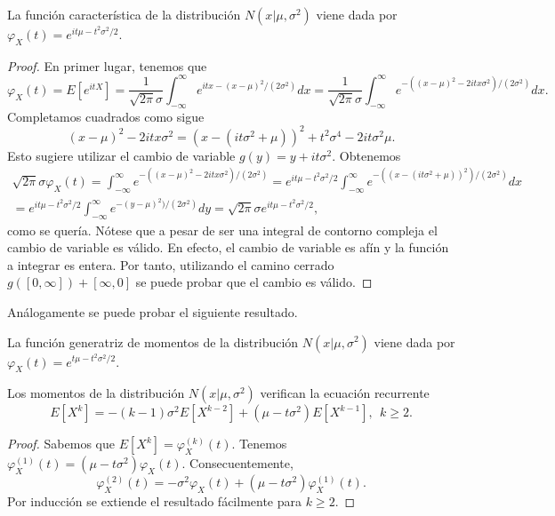 \documentclass{article}
\begin{document}
\begin{prop} \label{prop:normal:cf}
    La función característica de la distribución $N(x|\mu, \sigma^2)$ viene dada por $\varphi_X(t) = e^{it\mu - t^2 \sigma^2 / 2}$.
\end{prop}
\begin{proof}
    En primer lugar, tenemos que
    \[\varphi_X(t) = E[e^{itX}] = \frac{1}{\sqrt{2\pi}\sigma} \int_{-\infty}^{\infty} e^{itx-(x-\mu)^2 / (2\sigma^2)} dx = \frac{1}{\sqrt{2\pi}\sigma} \int_{-\infty}^{\infty} e^{-((x-\mu)^2 - 2itx\sigma^2) / (2\sigma^2)} dx.\]
    Completamos cuadrados como sigue
    \[(x-\mu)^2 - 2 itx\sigma^2 = (x - (it \sigma^2 + \mu))^2 + t^2 \sigma^4 - 2it\sigma^2 \mu.\]
    Esto sugiere utilizar el cambio de variable $g(y) = y + it \sigma^2$. Obtenemos
    \begin{align*}
        \sqrt{2\pi}\sigma \varphi_X(t) = \int_{-\infty}^{\infty} e^{-((x-\mu)^2 - 2itx\sigma^2) / (2\sigma^2)} = e^{it\mu - t^2 \sigma^2 / 2} \int_{-\infty}^{\infty} e^{-((x-(it \sigma^2 + \mu))^2 ) / (2\sigma^2)} dx \\
        = e^{it\mu - t^2 \sigma^2 / 2} \int_{-\infty}^{\infty} e^{-(y - \mu)^2 ) / (2\sigma^2)} dy = \sqrt{2\pi}\sigma e^{it\mu - t^2 \sigma^2 / 2},
    \end{align*}
    como se quería.
    Nótese que a pesar de ser una integral de contorno compleja el cambio de variable es válido. En efecto, el cambio de variable es afín y la función a integrar es entera. Por tanto, utilizando el camino cerrado $g([0, \infty]) + [\infty, 0]$ se puede probar que el cambio es válido.
\end{proof}

Análogamente se puede probar el siguiente resultado.

\begin{prop} \label{prop:normal:gm}
    La función generatriz de momentos de la distribución $N(x|\mu, \sigma^2)$ viene dada por $\varphi_X(t) = e^{t\mu - t^2 \sigma^2 / 2}$.
\end{prop}

\begin{cor} \label{cor:normal:rec}
    Los momentos de la distribución $N(x|\mu,\sigma^2)$ verifican la ecuación recurrente
    \[E[X^k] = -(k-1)\sigma^2 E[X^{k-2}] + (\mu - t \sigma^2) E[X^{k-1}], \ \  k \ge 2.\]
\end{cor}
\begin{proof}
    Sabemos que $E[X^k] = \varphi_X^{(k)}(t)$. Tenemos $\varphi_X^{(1)}(t) = (\mu - t \sigma^2) \varphi_X(t)$. Consecuentemente,
    \[\varphi_X^{(2)}(t) = -\sigma^2 \varphi_X(t) + (\mu - t \sigma^2) \varphi_X^{(1)}(t).\]
    Por inducción se extiende el resultado fácilmente para $k \ge 2$.
\end{proof}
\end{document}
